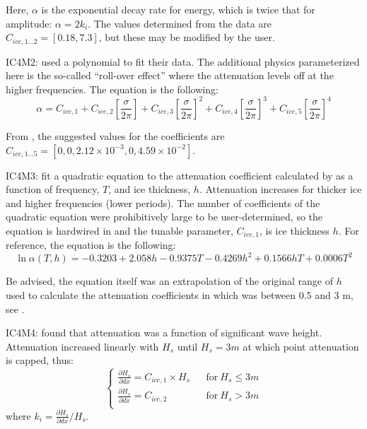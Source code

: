 \noindent Here, $\alpha$ is the exponential decay rate for energy, which is twice that for amplitude: $\alpha = 2k_i$. The values determined from the data are ${C_{ice,1...2}}=[0.18, 7.3]$, but these may be modified by the user. 

{\code IC4M2}: \cite{art:MBK14} used a polynomial to fit their data. The additional physics parameterized here is the so-called “roll-over effect” where the attenuation levels off at the higher frequencies. The equation is the following:
\begin{equation}\label{eq:ice2}
  {\alpha} = C_{ice,1} + C_{ice,2}\left[{\frac{\sigma}{2\pi}}\right] + C_{ice,3}\left[{\frac{\sigma}{2\pi}}\right]^2 + C_{ice,4}\left[{\frac{\sigma}{2\pi}}\right]^3 + C_{ice,5}\left[{\frac{\sigma}{2\pi}}\right]^4
\end{equation}

\noindent
From \cite{art:MBK14}, the suggested values for the coefficients are ${C_{ice,1...5}}=[0, 0, 2.12\times 10^{-3}, 0, 4.59\times 10^{-2}]$.

{\code IC4M3}: \cite{art:HT15} fit a quadratic equation to the attenuation coefficient calculated by \cite{art:KM08} as a function of frequency, $T$, and ice thickness, $h$. Attenuation increases for thicker ice and higher frequencies (lower periods). The number of  coefficients of the quadratic equation were prohibitively large to be user-determined, so the equation is hardwired in and the tunable parameter, ${C_{ice,1}}$, is ice thickness  $h$. For reference, the equation is the following:
\begin{equation}\label{eq:ice3}
  {\ln{\alpha(T,h)}} = -0.3203 + 2.058h - 0.9375T - 0.4269h^2 + 0.1566hT + 0.0006T^2
\end{equation}

\noindent
Be advised, the equation itself was an extrapolation of the original range of $h$ used to calculate the attenuation coefficients in \cite{art:KM08} which was between 0.5 and 3 m, see \cite{art:HT15}. 

{\code IC4M4}: \cite{art:Ko14} found that attenuation was a function of significant wave height. Attenuation increased linearly with ${H_s}$ until ${H_s} = 3 m$ at which point attenuation is capped, thus:
\begin{equation}
\left \{
\begin{array}{llrcl}
{\frac{\partial H_s}{\partial dx}} = {C_{ice,1}}\times {H_s}   & & \text{for} \> {H_s} \leq 3 m  \\
{\frac{\partial H_s}{\partial dx}} = {C_{ice,2}}               & & \text{for} \> {H_s} > 3 m     \\
\end{array} \right .
\end{equation}
where {$k_i=\frac{\partial H_s}{\partial dx}/H_s$}.

